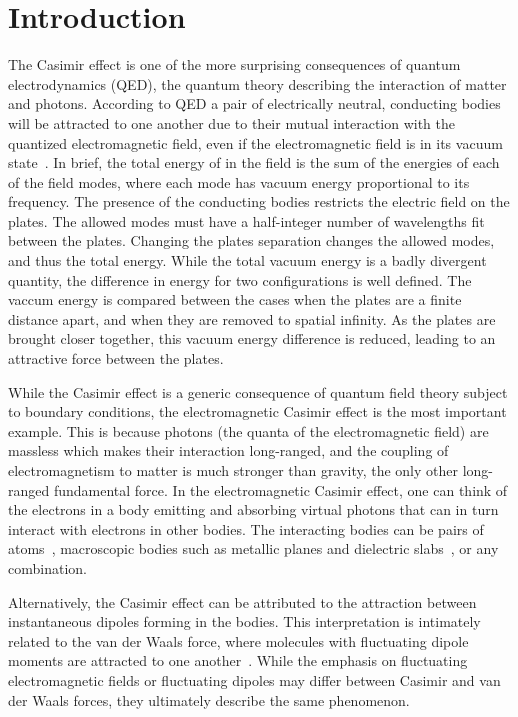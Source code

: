 \chapter{Introduction}
\label{ch:introduction}

The Casimir effect is one of the more surprising consequences of quantum electrodynamics (QED), the quantum theory
describing the interaction of matter and photons.
According to QED a pair of  electrically neutral, conducting bodies will be attracted to one another due to their mutual interaction
with the quantized electromagnetic field, even if the electromagnetic field is in its vacuum state~\cite{Casimir1948}.  
In brief, the total energy of in the field is the sum of the energies of each of the field modes, 
where each mode has vacuum energy proportional to its frequency.   
The presence of the conducting bodies restricts the electric field on the plates.
The allowed modes must have a half-integer number of wavelengths fit between the plates.  
Changing the plates separation changes the allowed modes, and thus the total energy. 
While the total vacuum energy is a badly divergent quantity, the difference in energy for two configurations
is well defined.  
The vaccum energy is compared between the cases when the plates are a finite distance apart, and when
they are removed to spatial infinity.  
As the plates are brought closer together, this vacuum energy difference is reduced, leading to an attractive force
between the plates.  

While the Casimir effect is a generic consequence of quantum field theory subject to boundary conditions,
the electromagnetic Casimir effect is the most important example.  
This is because photons (the quanta of the electromagnetic field) are massless which makes their interaction long-ranged, 
and the coupling of electromagnetism to matter is much stronger than gravity, the only other long-ranged fundamental force.  
In the electromagnetic Casimir effect, one can think of the electrons in a body emitting and absorbing virtual photons that can in turn
interact with electrons in other bodies. %
The interacting bodies can be pairs of atoms~\cite{CasimirPolder1948}, 
macroscopic bodies such as metallic planes and dielectric slabs~\cite{Lifshitz1956}, or any combination.

Alternatively, the Casimir effect can be attributed to the attraction between instantaneous dipoles forming in the bodies.  
This interpretation is intimately related to the van der Waals force, where 
molecules with fluctuating dipole moments are attracted to one another~\cite{vanderWaals}.
While the emphasis on fluctuating electromagnetic fields or fluctuating dipoles may differ between Casimir and van der Waals forces,
they ultimately describe the same phenomenon.%

